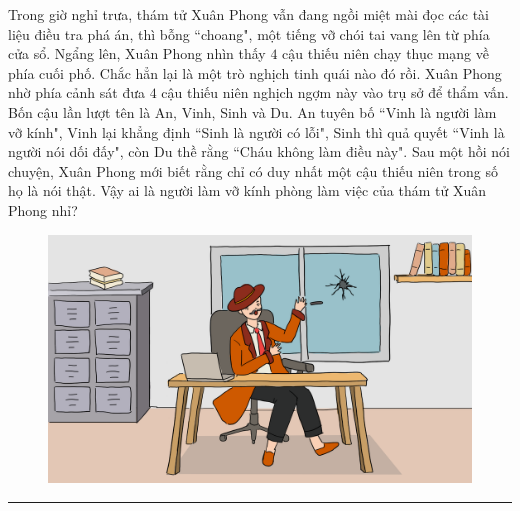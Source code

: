 \begin{multicols}{2}
	Trong giờ nghỉ trưa, thám tử Xuân Phong vẫn đang ngồi miệt mài đọc các tài liệu điều tra phá án, thì bỗng ``choang", một tiếng vỡ chói tai vang lên từ phía cửa sổ. Ngẩng lên, Xuân Phong nhìn thấy $4$ cậu thiếu niên chạy thục mạng về phía cuối phố. Chắc hẳn lại là một trò nghịch tinh quái nào đó rồi.
	\vskip 0.15cm 
	Xuân Phong nhờ phía cảnh sát đưa $4$ cậu thiếu niên nghịch ngợm này vào trụ sở để thẩm vấn. Bốn cậu lần lượt tên là An, Vinh, Sinh và Du. An tuyên bố ``Vinh là người làm vỡ kính", Vinh lại khẳng định ``Sinh là người có lỗi",  Sinh thì quả quyết ``Vinh là người nói dối đấy", còn Du thề rằng ``Cháu không làm điều này". 
	Sau một hồi nói chuyện, Xuân Phong mới biết rằng chỉ có duy nhất một cậu thiếu niên trong số họ là nói thật. Vậy ai là người làm vỡ kính phòng làm việc của thám tử Xuân Phong nhỉ?
	\begin{figure}[H]
		\vspace*{-5pt}
		\centering
		\captionsetup{labelformat= empty, justification=centering}
		\includegraphics[width= 1\linewidth]{xp}
		\vspace*{-12pt}
	\end{figure}
\end{multicols}
\vspace*{-10pt}
\rule{1\linewidth}{0.1pt}
\begingroup
